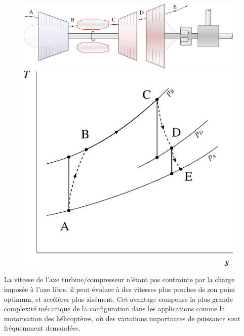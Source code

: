 		\begin{figure}
			\begin{center}
				\includegraphics[scale=0.6]{images/circuit_turbine_libre.png}\vspace{0.5cm}
				\includegraphics[scale=0.8]{images/ts_gp_turbine_libre.png}
			\end{center}
			\label{fig_turbine_libre}
		\end{figure}

		La vitesse de l’axe turbine/compresseur n’étant pas contrainte par la charge imposée à l’axe libre, il peut évoluer à des vitesses plus proches de son point optimum, et accélérer plus aisément. Cet avantage compense la plus grande complexité mécanique de la configuration dans les applications comme la motorisation des hélicoptères, où des variations importantes de puissance sont fréquemment demandées.

